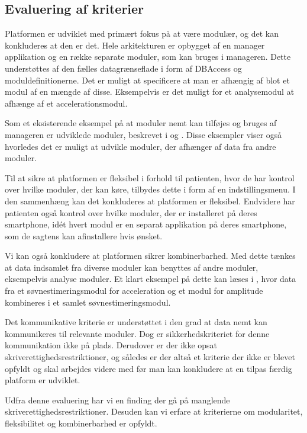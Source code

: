 \subsection{Evaluering af kriterier}
\begin{description}[style=nextline]
	\item[Modulær]
	Platformen er udviklet med primært fokus på at være modulær, og det kan konkluderes at den er det.
	Hele arkitekturen er opbygget af en manager applikation og en række separate moduler, som kan bruges i manageren.
	Dette understøttes af den fælles datagrænseflade i form af DBAccess og moduldefinitionerne.  
	Det er muligt at specificere at man er afhængig af blot et modul af en mængde af disse.
	Eksempelvis er det muligt for et analysemodul at afhænge af et accelerationsmodul.
	
	Som et eksisterende eksempel på at moduler nemt kan tilføjes og bruges af manageren er udviklede moduler, beskrevet i \citet{misc:soevnrapp} og \citet{misc:surveyrapp}.
	Disse eksempler viser også hvorledes det er muligt at udvikle moduler, der afhænger af data fra andre moduler.
	
	\item[Fleksibilitet]
	Til at sikre at platformen er fleksibel i forhold til patienten, hvor de har kontrol over hvilke moduler, der kan køre, tilbydes dette i form af en indstillingsmenu.
	I den sammenhæng kan det konkluderes at platformen er fleksibel.
	Endvidere har patienten også kontrol over hvilke moduler, der er installeret på deres smartphone, idét hvert modul er en separat applikation på deres smartphone, som de sagtens kan afinstallere hvis ønsket.
	
	\item[Kombinerbar]
	Vi kan også konkludere at platformen sikrer kombinerbarhed.
	Med dette tænkes at data indsamlet fra diverse moduler kan benyttes af andre moduler, eksempelvis analyse moduler.
	Et klart eksempel på dette kan læses i \citet{misc:soevnrapp}, hvor data fra et søvnestimeringsmodul for acceleration og et modul for amplitude kombineres i et samlet søvnestimeringsmodul.
	
	\item[Kommunikativ]
	Det kommunikative kriterie er understøttet i den grad at data nemt kan kommunikeres til relevante moduler.
	Dog er sikkerhedskriteriet for denne kommunikation ikke på plads.
	Derudover er der ikke opsat skriverettighedsrestriktioner, og således er der altså et kriterie der ikke er blevet opfyldt og skal arbejdes videre med før man kan konkludere at en tilpas færdig platform er udviklet.
\end{description}
Udfra denne evaluering har vi en finding der gå på manglende skriverettighedsrestriktioner.
Desuden kan vi erfare at kriterierne om modularitet, fleksibilitet og kombinerbarhed er opfyldt.
